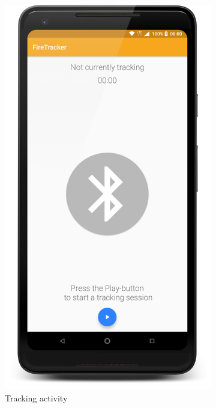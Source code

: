 \documentclass[../Main/thesis.tex]{subfiles}
\begin{document}
\begin{figure}[h]
\begin{subfigure}{0.2\textwidth}
		\includegraphics[width=\textwidth]{../fig/firetracker_app_old_2}
		\caption{Tracking activity}
		\label{fig:app-first-prototype-trackingactivity}
	\end{subfigure}
	\begin{subfigure}{0.2\textwidth}

\end{subfigure}
\end{figure}
\end{document}
